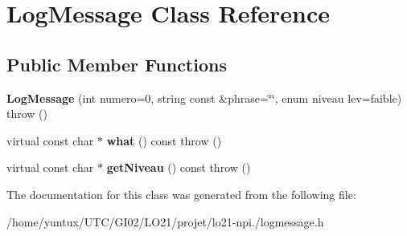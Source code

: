 \hypertarget{class_log_message}{\section{\-Log\-Message \-Class \-Reference}
\label{class_log_message}
}
\subsection*{\-Public \-Member \-Functions}
\begin{DoxyCompactItemize}
\item 
\hypertarget{class_log_message_aab5078209d6e258af2664286ab5b36f1}{{\bfseries \-Log\-Message} (int numero=0, string const \&phrase=\char`\"{}\char`\"{}, enum niveau lev=faible)  throw ()}\label{class_log_message_aab5078209d6e258af2664286ab5b36f1}

\item 
\hypertarget{class_log_message_a2c6798fafd31aa115d18bd348da69e25}{virtual const char $\ast$ {\bfseries what} () const   throw ()}\label{class_log_message_a2c6798fafd31aa115d18bd348da69e25}

\item 
\hypertarget{class_log_message_a433d0d6bdef1d3ec814fa08aec76e8ca}{virtual const char $\ast$ {\bfseries get\-Niveau} () const   throw ()}\label{class_log_message_a433d0d6bdef1d3ec814fa08aec76e8ca}

\end{DoxyCompactItemize}


\-The documentation for this class was generated from the following file\-:\begin{DoxyCompactItemize}
\item 
/home/yuntux/\-U\-T\-C/\-G\-I02/\-L\-O21/projet/lo21-\/npi./logmessage.\-h\end{DoxyCompactItemize}

